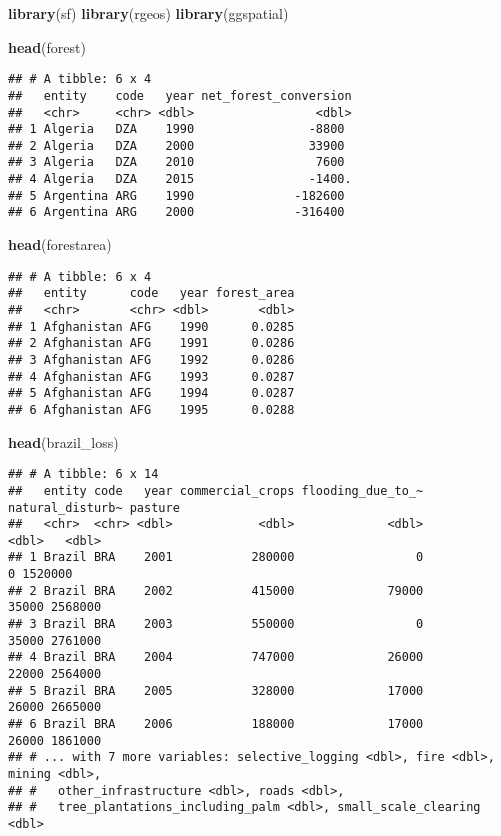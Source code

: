 \documentclass[
]{article}
\newenvironment{Shaded}{\begin{snugshade}}{\end{snugshade}}
\newcommand{\KeywordTok}[1]{\textcolor[rgb]{0.13,0.29,0.53}{\textbf{#1}}}
\newcommand{\NormalTok}[1]{#1}
\begin{document}
\begin{Shaded}
\begin{Highlighting}[]
\KeywordTok{library}\NormalTok{(sf)}
\KeywordTok{library}\NormalTok{(rgeos)}
\KeywordTok{library}\NormalTok{(ggspatial)}

\KeywordTok{head}\NormalTok{(forest)}
\end{Highlighting}
\end{Shaded}

\begin{verbatim}
## # A tibble: 6 x 4
##   entity    code   year net_forest_conversion
##   <chr>     <chr> <dbl>                 <dbl>
## 1 Algeria   DZA    1990                -8800 
## 2 Algeria   DZA    2000                33900 
## 3 Algeria   DZA    2010                 7600 
## 4 Algeria   DZA    2015                -1400.
## 5 Argentina ARG    1990              -182600 
## 6 Argentina ARG    2000              -316400
\end{verbatim}

\begin{Shaded}
\begin{Highlighting}[]
\KeywordTok{head}\NormalTok{(forestarea)}
\end{Highlighting}
\end{Shaded}

\begin{verbatim}
## # A tibble: 6 x 4
##   entity      code   year forest_area
##   <chr>       <chr> <dbl>       <dbl>
## 1 Afghanistan AFG    1990      0.0285
## 2 Afghanistan AFG    1991      0.0286
## 3 Afghanistan AFG    1992      0.0286
## 4 Afghanistan AFG    1993      0.0287
## 5 Afghanistan AFG    1994      0.0287
## 6 Afghanistan AFG    1995      0.0288
\end{verbatim}

\begin{Shaded}
\begin{Highlighting}[]
\KeywordTok{head}\NormalTok{(brazil\_loss)}
\end{Highlighting}
\end{Shaded}

\begin{verbatim}
## # A tibble: 6 x 14
##   entity code   year commercial_crops flooding_due_to_~ natural_disturb~ pasture
##   <chr>  <chr> <dbl>            <dbl>             <dbl>            <dbl>   <dbl>
## 1 Brazil BRA    2001           280000                 0                0 1520000
## 2 Brazil BRA    2002           415000             79000            35000 2568000
## 3 Brazil BRA    2003           550000                 0            35000 2761000
## 4 Brazil BRA    2004           747000             26000            22000 2564000
## 5 Brazil BRA    2005           328000             17000            26000 2665000
## 6 Brazil BRA    2006           188000             17000            26000 1861000
## # ... with 7 more variables: selective_logging <dbl>, fire <dbl>, mining <dbl>,
## #   other_infrastructure <dbl>, roads <dbl>,
## #   tree_plantations_including_palm <dbl>, small_scale_clearing <dbl>
\end{verbatim}
\end{document}
